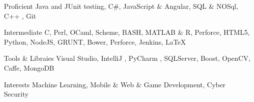 

\begin{cvskills}

  \cvskill
    {Proficient} %
    {Java and JUnit testing, C\#, JavaScript \& Angular, SQL \& NOSql, C++ ,  Git} %

  \cvskill
    {Intermediate} %
    {C, Perl, OCaml, Scheme, BASH, MATLAB \& R, Perforce, HTML5, Python, NodeJS, GRUNT, Bower, Perforce, Jenkins, \LaTeX } %
	
  \cvskill
	{Tools \& Libraies} %
	{Visual Studio, IntelliJ , PyCharm , SQLServer, Boost, OpenCV, Caffe, MongoDB} %
	
  \cvskill
    {Interests} %
    {Machine Learning, Mobile \& Web \& Game Development, Cyber Security} %
    
  
   
    

\end{cvskills}
